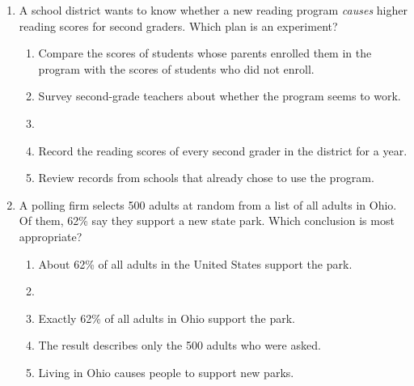\documentclass[12pt]{article}
\begin{document}
\begin{enumerate}[leftmargin=1.9em, itemsep=0.10in]

  \item A school district wants to know whether a new reading program \emph{causes} higher
        reading scores for second graders. Which plan is an experiment?
        \begin{enumerate}[label=\textbf{(\Alph*)}, leftmargin=2.2em, itemsep=1pt]
          \item Compare the scores of students whose parents enrolled them in the program with
                the scores of students who did not enroll.
          \item Survey second-grade teachers about whether the program seems to work.
          \item {}
          \item Record the reading scores of every second grader in the district for a year.
          \item Review records from schools that already chose to use the program.
                \hfill{}\rule[-0.2in]{0pt}{0.48in}
        \end{enumerate}

  \item A polling firm selects 500 adults at random from a list of all adults in Ohio. Of
        them, 62\% say they support a new state park. Which conclusion is most appropriate?
        \begin{enumerate}[label=\textbf{(\Alph*)}, leftmargin=2.2em, itemsep=1pt]
          \item About 62\% of all adults in the United States support the park.
          \item {}
          \item Exactly 62\% of all adults in Ohio support the park.
          \item The result describes only the 500 adults who were asked.
          \item Living in Ohio causes people to support new parks.
                \hfill{}\rule[-0.2in]{0pt}{0.48in}
        \end{enumerate}

\end{enumerate}
\end{document}
